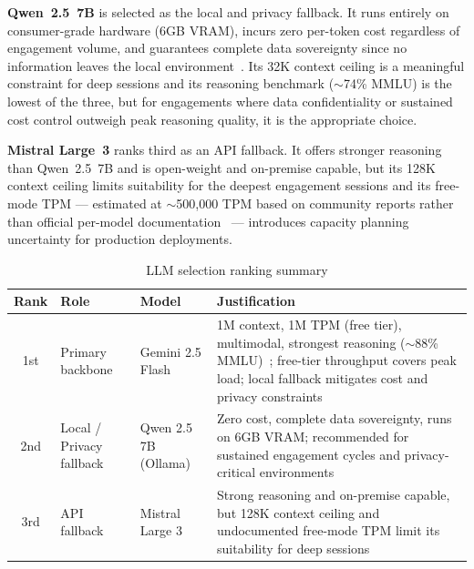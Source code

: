 \documentclass[12pt,a4paper]{report}
\begin{document}
\textbf{Qwen~2.5~7B} is selected as the local and privacy fallback. It runs
entirely on consumer-grade hardware (6GB VRAM), incurs zero per-token cost
regardless of engagement volume, and guarantees complete data sovereignty since
no information leaves the local environment~\cite{qwen25report}. Its 32K context
ceiling is a meaningful constraint for deep sessions and its reasoning benchmark
($\sim$74\% MMLU) is the lowest of the three, but for engagements where data
confidentiality or sustained cost control outweigh peak reasoning quality, it
is the appropriate choice.

\textbf{Mistral Large~3} ranks third as an API fallback. It offers stronger
reasoning than Qwen~2.5~7B and is open-weight and on-premise capable, but its
128K context ceiling limits suitability for the deepest engagement sessions and
its free-mode TPM --- estimated at $\sim$500{,}000 TPM based on community reports
rather than official per-model documentation~\cite{mistralDocs} --- introduces
capacity planning uncertainty for production deployments.

\begin{table}[H]
    \centering
    \renewcommand{\arraystretch}{1.35}
    \begin{tabular}{|c|p{}|p{}|p{}|}
        \hline
        \textbf{Rank} & \textbf{Role} & \textbf{Model} &
        \textbf{Justification} \\
        \hline
        1st & Primary backbone &
        Gemini 2.5 Flash &
        1M context, 1M TPM (free tier), multimodal, strongest
        reasoning ($\sim$88\% MMLU)~\cite{llmstatsFlash}; free-tier
        throughput covers peak load; local fallback mitigates cost
        and privacy constraints \\
        \hline
        2nd & Local / Privacy fallback &
        Qwen 2.5 7B (Ollama) &
        Zero cost, complete data sovereignty, runs on 6GB VRAM;
        recommended for sustained engagement cycles and
        privacy-critical environments~\cite{qwen25report} \\
        \hline
        3rd & API fallback &
        Mistral Large 3 &
        Strong reasoning and on-premise capable, but 128K context
        ceiling and undocumented free-mode TPM limit its suitability
        for deep sessions~\cite{mistralDocs} \\
        \hline
    \end{tabular}
    \caption{LLM selection ranking summary}
    \label{tab:llm_decision}
\end{table}
\end{document}
